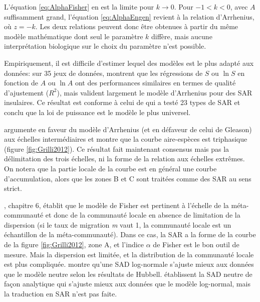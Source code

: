 \documentclass[
  11pt,
  french,
  a4paper,
  extrafontsizes,onecolumn,openright
  ]{memoir}
\newlength{\rf}
\begin{document}
L'équation \eqref{eq:AlphaFisher} en est la limite pour \(k \to 0\).
Pour \(-1<k<0\), avec \(A\) suffisamment grand, l'équation \eqref{eq:AlphaEngen} revient à la relation d'Arrhenius, où \(z=-k\).
Les deux relations peuvent donc être obtenues à partir du même modèle mathématique dont seul le paramètre \(k\) diffère, mais aucune interprétation biologique sur le choix du paramètre n'est possible.

Empiriquement, il est difficile d'estimer lequel des modèles est le plus adapté aux données: sur 35 jeux de données, \textcite{Connor1979} montrent que les régressions de \(S\) ou \(\ln S\) en fonction de \(A\) ou \(\ln A\) ont des performances similaires en termes de qualité d'ajustement (\(R^2\)), mais \textcite{Triantis2012} valident largement le modèle d'Arrhenius pour des SAR insulaires.
Ce résultat est conforme à celui de \textcite{Dengler2009} qui a testé 23 types de SAR et conclu que la loi de puissance est le modèle le plus universel.

\textcite{Preston1960} argumente en faveur du modèle d'Arrhenius (et en défaveur de celui de Gleason) aux échelles intermédiaires et montre que la courbe aire-espèces est triphasique (figure \ref{fig:Grilli2012}).
Ce résultat fait maintenant consensus mais pas la délimitation des trois échelles, ni la forme de la relation aux échelles extrêmes.
On notera que la partie locale de la courbe est en général une courbe d'accumulation, alors que les zones B et C sont traitées comme des SAR au sens strict.

\textcite{Hubbell2001}, chapitre 6, établit que le modèle de Fisher est pertinent à l'échelle de la méta-communauté et donc de la communauté locale en absence de limitation de la dispersion (si le taux de migration \emph{m} vaut 1, la communauté locale est un échantillon de la méta-communauté).
Dans ce cas, la SAR a la forme de la courbe de la figure \ref{fig:Grilli2012}, zone A, et l'indice \(\alpha\) de Fisher est le bon outil de mesure.
Mais la dispersion est limitée, et la distribution de la communauté locale est plus compliquée.
\textcite{McGill2003} montre qu'une SAD log-normale s'ajuste mieux aux données que le modèle neutre selon les résultats de Hubbell.
\textcite{Volkov2003} établissent la SAD neutre de façon analytique qui s'ajuste mieux aux données que le modèle log-normal, mais la traduction en SAR n'est pas faite.

\scriptsize
\end{document}
